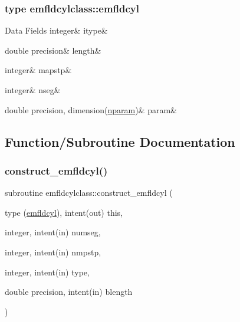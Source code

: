 \subsubsection{type emfldcylclass\+::emfldcyl}
\begin{DoxyFields}{Data Fields}
\mbox{\label{namespaceemfldcylclass_a3ba2c596d30c652482c75aa404dfbf85}} 
integer&
itype&
\\
\hline

\mbox{\label{namespaceemfldcylclass_a7db15b53a24d51010742b079320eaf82}} 
double precision&
length&
\\
\hline

\mbox{\label{namespaceemfldcylclass_ae91a238805ec7c8877fe7678af96d14f}} 
integer&
mapstp&
\\
\hline

\mbox{\label{namespaceemfldcylclass_a0e3fc4ea59fb87362a87c87bd7381c99}} 
integer&
nseg&
\\
\hline

\mbox{\label{namespaceemfldcylclass_aae12b122be9447025032a7afbb39d0ff}} 
double precision, dimension(\mbox{\hyperlink{namespaceemfldcylclass_a4b336ecf0cd4052beb8ac386391e19e9}{nparam}})&
param&
\\
\hline

\end{DoxyFields}


\subsection{Function/\+Subroutine Documentation}
\mbox{\label{namespaceemfldcylclass_a70ad259f3db6c392c07a4fa46cb7461b}} 
\subsubsection{\texorpdfstring{construct\_emfldcyl()}{construct\_emfldcyl()}}
{\footnotesize\ttfamily subroutine emfldcylclass\+::construct\+\_\+emfldcyl (\begin{DoxyParamCaption}\item[{type (\mbox{\hyperlink{namespaceemfldcylclass_structemfldcylclass_1_1emfldcyl}{emfldcyl}}), intent(out)}]{this,  }\item[{integer, intent(in)}]{numseg,  }\item[{integer, intent(in)}]{nmpstp,  }\item[{integer, intent(in)}]{type,  }\item[{double precision, intent(in)}]{blength }\end{DoxyParamCaption})}

